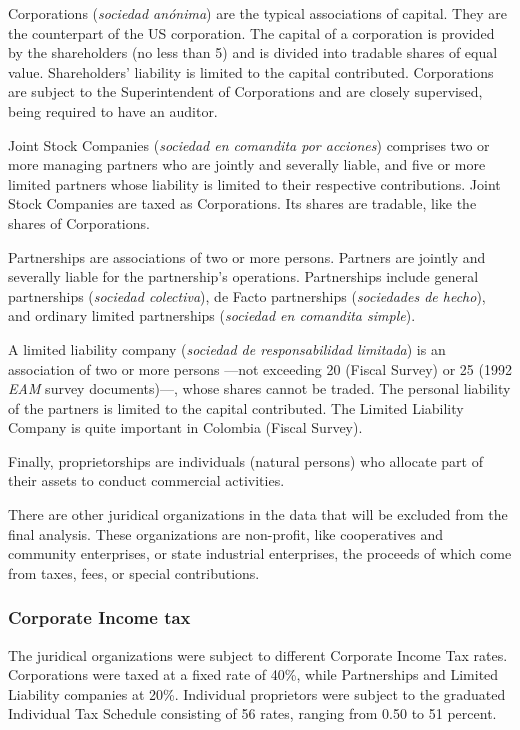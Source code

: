 \documentclass[
  12pt]{article}
\theoremstyle{definition}
\theoremstyle{remark}
\begin{document}
Corporations (\emph{sociedad anónima}) are the typical associations of
capital. They are the counterpart of the US corporation. The capital of
a corporation is provided by the shareholders (no less than 5) and is
divided into tradable shares of equal value. Shareholders' liability is
limited to the capital contributed. Corporations are subject to the
Superintendent of Corporations and are closely supervised, being
required to have an auditor.

Joint Stock Companies (\emph{sociedad en comandita por acciones})
comprises two or more managing partners who are jointly and severally
liable, and five or more limited partners whose liability is limited to
their respective contributions. Joint Stock Companies are taxed as
Corporations. Its shares are tradable, like the shares of Corporations.

Partnerships are associations of two or more persons. Partners are
jointly and severally liable for the partnership's operations.
Partnerships include general partnerships (\emph{sociedad colectiva}),
de Facto partnerships (\emph{sociedades de hecho}), and ordinary limited
partnerships (\emph{sociedad en comandita simple}).

A limited liability company (\emph{sociedad de responsabilidad
limitada}) is an association of two or more persons ---not exceeding 20
(Fiscal Survey) or 25 (1992 \emph{EAM} survey documents)---, whose
shares cannot be traded. The personal liability of the partners is
limited to the capital contributed. The Limited Liability Company is
quite important in Colombia (Fiscal Survey).

Finally, proprietorships are individuals (natural persons) who allocate
part of their assets to conduct commercial activities.

There are other juridical organizations in the data that will be
excluded from the final analysis. These organizations are non-profit,
like cooperatives and community enterprises, or state industrial
enterprises, the proceeds of which come from taxes, fees, or special
contributions.

\subsubsection{Corporate Income tax}\label{corporate-income-tax}

The juridical organizations were subject to different Corporate Income
Tax rates. Corporations were taxed at a fixed rate of 40\%, while
Partnerships and Limited Liability companies at 20\%. Individual
proprietors were subject to the graduated Individual Tax Schedule
consisting of 56 rates, ranging from 0.50 to 51 percent.
\end{document}
